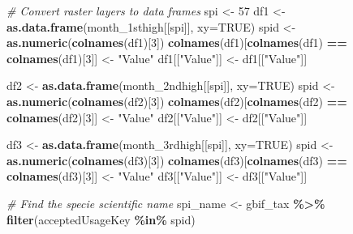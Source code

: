 \documentclass[
]{article}
\newenvironment{Shaded}{\begin{snugshade}}{\end{snugshade}}
\newcommand{\AttributeTok}[1]{\textcolor[rgb]{0.13,0.29,0.53}{#1}}
\newcommand{\CommentTok}[1]{\textcolor[rgb]{0.56,0.35,0.01}{\textit{#1}}}
\newcommand{\ConstantTok}[1]{\textcolor[rgb]{0.56,0.35,0.01}{#1}}
\newcommand{\DecValTok}[1]{\textcolor[rgb]{0.00,0.00,0.81}{#1}}
\newcommand{\FunctionTok}[1]{\textcolor[rgb]{0.13,0.29,0.53}{\textbf{#1}}}
\newcommand{\NormalTok}[1]{#1}
\newcommand{\OtherTok}[1]{\textcolor[rgb]{0.56,0.35,0.01}{#1}}
\newcommand{\SpecialCharTok}[1]{\textcolor[rgb]{0.81,0.36,0.00}{\textbf{#1}}}
\newcommand{\StringTok}[1]{\textcolor[rgb]{0.31,0.60,0.02}{#1}}
\begin{document}
\begin{Shaded}
\begin{Highlighting}[]
\CommentTok{\# Convert raster layers to data frames}
\NormalTok{spi }\OtherTok{\textless{}{-}} \DecValTok{57}
\NormalTok{df1 }\OtherTok{\textless{}{-}} \FunctionTok{as.data.frame}\NormalTok{(month\_1sthigh[[spi]], }\AttributeTok{xy=}\ConstantTok{TRUE}\NormalTok{)}
\NormalTok{spid }\OtherTok{\textless{}{-}} \FunctionTok{as.numeric}\NormalTok{(}\FunctionTok{colnames}\NormalTok{(df1)[}\DecValTok{3}\NormalTok{])}
\FunctionTok{colnames}\NormalTok{(df1)[}\FunctionTok{colnames}\NormalTok{(df1) }\SpecialCharTok{==} \FunctionTok{colnames}\NormalTok{(df1)[}\DecValTok{3}\NormalTok{]] }\OtherTok{\textless{}{-}} \StringTok{"Value"}
\NormalTok{df1[[}\StringTok{"Value"}\NormalTok{]] }\OtherTok{\textless{}{-}}\NormalTok{ df1[[}\StringTok{"Value"}\NormalTok{]]}

\NormalTok{df2 }\OtherTok{\textless{}{-}} \FunctionTok{as.data.frame}\NormalTok{(month\_2ndhigh[[spi]], }\AttributeTok{xy=}\ConstantTok{TRUE}\NormalTok{)}
\NormalTok{spid }\OtherTok{\textless{}{-}} \FunctionTok{as.numeric}\NormalTok{(}\FunctionTok{colnames}\NormalTok{(df2)[}\DecValTok{3}\NormalTok{])}
\FunctionTok{colnames}\NormalTok{(df2)[}\FunctionTok{colnames}\NormalTok{(df2) }\SpecialCharTok{==} \FunctionTok{colnames}\NormalTok{(df2)[}\DecValTok{3}\NormalTok{]] }\OtherTok{\textless{}{-}} \StringTok{"Value"}
\NormalTok{df2[[}\StringTok{"Value"}\NormalTok{]] }\OtherTok{\textless{}{-}}\NormalTok{ df2[[}\StringTok{"Value"}\NormalTok{]]}

\NormalTok{df3 }\OtherTok{\textless{}{-}} \FunctionTok{as.data.frame}\NormalTok{(month\_3rdhigh[[spi]], }\AttributeTok{xy=}\ConstantTok{TRUE}\NormalTok{)}
\NormalTok{spid }\OtherTok{\textless{}{-}} \FunctionTok{as.numeric}\NormalTok{(}\FunctionTok{colnames}\NormalTok{(df3)[}\DecValTok{3}\NormalTok{])}
\FunctionTok{colnames}\NormalTok{(df3)[}\FunctionTok{colnames}\NormalTok{(df3) }\SpecialCharTok{==} \FunctionTok{colnames}\NormalTok{(df3)[}\DecValTok{3}\NormalTok{]] }\OtherTok{\textless{}{-}} \StringTok{"Value"}
\NormalTok{df3[[}\StringTok{"Value"}\NormalTok{]] }\OtherTok{\textless{}{-}}\NormalTok{ df3[[}\StringTok{"Value"}\NormalTok{]]}


\CommentTok{\# Find the specie scientific name}
\NormalTok{spi\_name }\OtherTok{\textless{}{-}}\NormalTok{ gbif\_tax }\SpecialCharTok{\%\textgreater{}\%}
  \FunctionTok{filter}\NormalTok{(acceptedUsageKey }\SpecialCharTok{\%in\%}\NormalTok{ spid)}
\end{Highlighting}
\end{Shaded}
\end{document}
